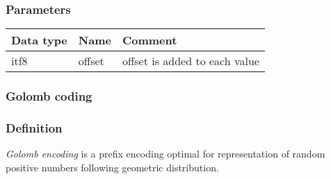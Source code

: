 \documentclass[a4paper]{article}
\begin{document}
\subsubsection*{Parameters}

\begin{tabular}{|>{\raggedright}p{144pt}|>{\raggedright}p{144pt}|>{\raggedright}p{144pt}|}
\hline
\textbf{Data type} & \textbf{Name} & \textbf{Comment}\tabularnewline
\hline
itf8 & offset & offset is added to each value\tabularnewline
\hline
\end{tabular}

\subsubsection*{Golomb coding}

\subsubsection*{Definition}

\emph{Golomb encoding} is a prefix encoding optimal for representation of random 
positive numbers following geometric distribution. 
\end{document}
